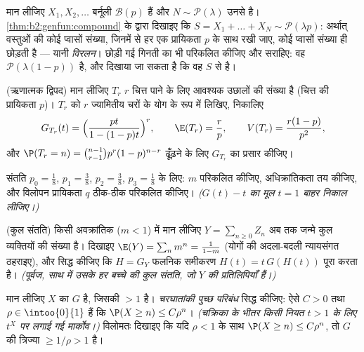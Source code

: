 \begin{exercise}[$\star\star$]\label{exo:b2:genfun:4}
मान लीजिए $X_1, X_2, \dots$  बर्नूली $\mathcal{B}(p)$ हैं और $N \sim \mathcal{P}(\lambda)$ उनसे  है।
\cref{thm:b2:genfun:compound} के द्वारा दिखाइए कि $S = X_1 + \dots + X_N
\sim \mathcal{P}(\lambda p)$: अर्थात् वस्तुओं की कोई प्वासों संख्या,
जिनमें से हर एक प्रायिकता $p$ के साथ रखी जाए, कोई प्वासों संख्या
ही छोड़ती है --- यानी \emph{विरलन}। छोड़ी गई गिनती का  भी
परिकलित कीजिए और सराहिए: वह $\mathcal{P}(\lambda(1-p))$ है, और दिखाया जा सकता है कि वह $S$
से  है।
\end{exercise}

\begin{exercise}[$\star\star$]\label{exo:b2:genfun:5}
(ऋणात्मक द्विपद) मान लीजिए $T_r$ $r$ चित्त पाने के लिए आवश्यक उछालों
की संख्या है (चित्त की प्रायिकता $p$)। $T_r$ को $r$ 
ज्यामितीय चरों के योग के रूप में लिखिए, निकालिए
\[
G_{T_r}(t) = \Bigl(\frac{pt}{1 - (1-p)t}\Bigr)^{r},
\qquad
\E(T_r) = \frac rp,
\qquad
V(T_r) = \frac{r(1-p)}{p^2},
\]
और $\P(T_r = n) = \binom{n-1}{r-1}
p^r(1-p)^{n-r}$ ढूँढ़ने के लिए $G_{T_r}$ का प्रसार कीजिए।
\end{exercise}

\begin{exercise}[$\star\star$]\label{exo:b2:genfun:6}
संतति  $p_0 = \frac18$, $p_1 = \frac38$, $p_2 =
\frac38$, $p_3 = \frac18$ के लिए: $m$ परिकलित कीजिए,
अधिक्रांतिकता तय कीजिए, और विलोपन प्रायिकता $q$ ठीक-ठीक परिकलित
कीजिए। \emph{($G(t) - t$ का मूल $t = 1$ बाहर निकाल लीजिए।)}
\end{exercise}

\begin{exercise}[$\star\star\star$]\label{exo:b2:genfun:7}
(कुल संतति) किसी अवक्रांतिक  ($m < 1$) में मान लीजिए $Y = \sum_{n\geq0} Z_n$
अब तक जन्मे कुल व्यक्तियों की संख्या है। दिखाइए $\E(Y) = \sum_n m^n = \frac{1}{1 - m}$ (योगों की
अदला-बदली न्यायसंगत ठहराइए), और सिद्ध कीजिए कि  $H = G_Y$ फलनिक
समीकरण $H(t) = t\,G(H(t))$ पूरा करता है। \emph{(पूर्वज, साथ में उसके हर बच्चे की
कुल संतति, जो $Y$ की  प्रतिलिपियाँ हैं।)}
\end{exercise}

\begin{exercise}[$\star\star\star$]\label{exo:b2:genfun:8}
मान लीजिए $X$ का  $G$ है, जिसकी  $>
1$ है।
\emph{चरघातांकी पुच्छ परिबंध} सिद्ध कीजिए: ऐसे $C > 0$ तथा $\rho \in \intoo{0}{1}$ हैं कि
$\P(X \geq n) \leq C\rho^n$। \emph{(चक्रिका के भीतर किसी नियत $t > 1$ के लिए $t^X$ पर लगाई गई
मार्कोव।)} विलोमतः दिखाइए कि यदि $\rho < 1$ के साथ $\P(X \geq n) \leq C\rho^n$, तो $G$ की
त्रिज्या $\geq 1/\rho > 1$ है।
\end{exercise}

